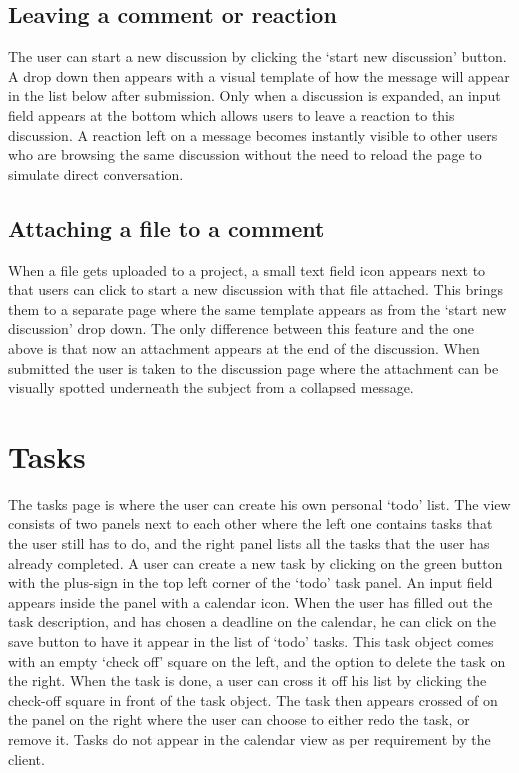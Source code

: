 \subsection{Leaving a comment or reaction}

The user can start a new discussion by clicking the `start new discussion' button. A drop down then appears with a visual template of how the message will appear in the list below after submission.  
Only when a discussion is expanded, an input field appears at the bottom which allows users to leave a reaction to this discussion. 
A reaction left on a message becomes instantly visible to other users who are browsing the same discussion without the need to reload the page to simulate direct conversation.

\subsection{Attaching a file to a comment}

When a file gets uploaded to a project, a small text field icon appears next to that users can click to start
a new discussion with that file attached. This brings them to a separate page where the same template appears
as from the `start new discussion' drop down. The only difference between this feature and the one above is that now an attachment appears at the end of the discussion. 
When submitted the user is taken to the discussion page where the attachment can be visually spotted underneath the subject from a collapsed message.

\section{Tasks}

The tasks page is where the user can create his own personal `todo' list. The view consists of two
panels next to each other where the left one contains tasks that the user still has to do,
and the right panel lists all the tasks that the user has already completed. A user can create
a new task by clicking on the green button with the plus-sign in the top left corner of the `todo' task
panel. An input field appears inside the panel with a calendar icon. When the user has filled out
the task description, and has chosen a deadline on the calendar, he can click on the save button to have
it appear in the list of `todo' tasks. This task object comes with an empty `check off' square on the left,
and the option to delete the task on the right. When the task is done, a user can cross it off his list by
clicking the check-off square in front of the task object. The task then appears crossed of on the panel on
the right where the user can choose to either redo the task, or remove it. Tasks do not appear in the calendar
view as per requirement by the client.

